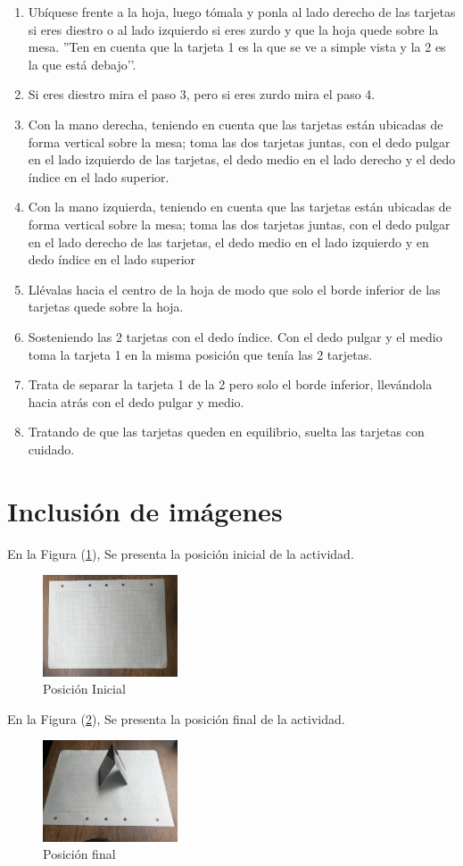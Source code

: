 \documentclass{article}
\begin{document}
\begin{enumerate}[1.]

    \item Ubíquese frente a la hoja, luego tómala y ponla al lado derecho de las             tarjetas si eres diestro o al lado izquierdo si eres zurdo y que la hoja          quede sobre la mesa. ''Ten en cuenta que la tarjeta 1 es la que se ve a           simple vista y la 2 es la que está debajo’'.
    \item Si eres diestro mira el paso 3, pero si eres zurdo mira el paso 4.
    \item Con la mano derecha, teniendo en cuenta que las tarjetas están ubicadas de        forma vertical sobre la mesa; toma las dos tarjetas juntas, con el dedo           pulgar en el lado izquierdo de las tarjetas, el dedo medio en el lado             derecho y el dedo índice en el lado superior.
    \item Con la mano izquierda, teniendo en cuenta que las tarjetas están ubicadas de       forma vertical sobre la mesa; toma las dos tarjetas juntas, con el dedo            pulgar en el lado derecho de las tarjetas, el dedo medio en el lado               izquierdo
         y en dedo índice en el lado superior
    \item Llévalas hacia el centro de la hoja de modo que solo el borde inferior de las     tarjetas quede sobre la hoja.
    \item Sosteniendo las 2 tarjetas con el dedo índice. Con el dedo pulgar y el medio       toma la tarjeta 1 en la misma posición que tenía las 2 tarjetas.
    \item Trata de separar la tarjeta 1 de la 2 pero solo el borde inferior,                llevándola hacia atrás con el dedo pulgar y medio.
    \item Tratando de que las tarjetas queden en equilibrio, suelta las tarjetas con        cuidado.
\end{enumerate}


\section{Inclusión de imágenes} \label{imagenes}

En la Figura (\ref{fig:posicion1}), Se presenta la posición inicial de la actividad.

\begin{figure}[h]
\includegraphics[width=4cm]{Posicion1.jpeg}
\centering
\caption{Posición Inicial}
\label{fig:posicion1}
\end{figure}


En la Figura (\ref{fig:posicion2}), Se presenta la posición final de la actividad.

\begin{figure}[h]
\includegraphics[width=4cm]{Posicion2.jpeg}
\centering
\caption{Posición final}
\label{fig:posicion2}
\end{figure}
\end{document}
